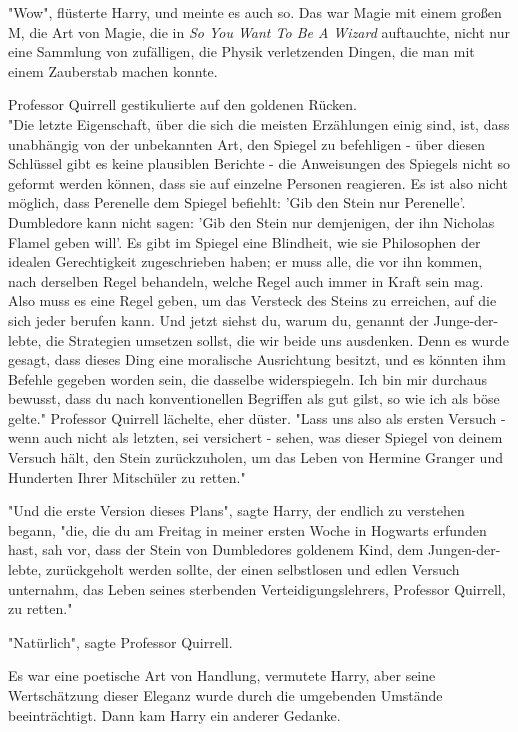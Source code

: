 {"Wow", flüsterte Harry, und meinte es auch so. Das war Magie mit einem großen M, die Art von Magie, die in \emph{So You Want To Be A Wizard} auftauchte, nicht nur eine Sammlung von zufälligen, die Physik verletzenden Dingen, die man mit einem Zauberstab machen konnte.

Professor Quirrell gestikulierte auf den goldenen Rücken.\\ "Die letzte Eigenschaft, über die sich die meisten Erzählungen einig sind, ist, dass unabhängig von der unbekannten Art, den Spiegel zu befehligen - über diesen Schlüssel gibt es keine plausiblen Berichte - die Anweisungen des Spiegels nicht so geformt werden können, dass sie auf einzelne Personen reagieren. Es ist also nicht möglich, dass Perenelle dem Spiegel befiehlt: 'Gib den Stein nur Perenelle'. Dumbledore kann nicht sagen: 'Gib den Stein nur demjenigen, der ihn Nicholas Flamel geben will'. Es gibt im Spiegel eine Blindheit, wie sie Philosophen der idealen Gerechtigkeit zugeschrieben haben; er muss alle, die vor ihn kommen, nach derselben Regel behandeln, welche Regel auch immer in Kraft sein mag. Also muss es eine Regel geben, um das Versteck des Steins zu erreichen, auf die sich jeder berufen kann. Und jetzt siehst du, warum du, genannt der Junge-der-lebte, die Strategien umsetzen sollst, die wir beide uns ausdenken. Denn es wurde gesagt, dass dieses Ding eine moralische Ausrichtung besitzt, und es könnten ihm Befehle gegeben worden sein, die dasselbe widerspiegeln. Ich bin mir durchaus bewusst, dass du nach konventionellen Begriffen als gut gilst, so wie ich als böse gelte." Professor Quirrell lächelte, eher düster. "Lass uns also als ersten Versuch - wenn auch nicht als letzten, sei versichert - sehen, was dieser Spiegel von deinem Versuch hält, den Stein zurückzuholen, um das Leben von Hermine Granger und Hunderten Ihrer Mitschüler zu retten."

"Und die erste Version dieses Plans", sagte Harry, der endlich zu verstehen begann, "die, die du am Freitag in meiner ersten Woche in Hogwarts erfunden hast, sah vor, dass der Stein von Dumbledores goldenem Kind, dem Jungen-der-lebte, zurückgeholt werden sollte, der einen selbstlosen und edlen Versuch unternahm, das Leben seines sterbenden Verteidigungslehrers, Professor Quirrell, zu retten."

"Natürlich", sagte Professor Quirrell.

Es war eine poetische Art von Handlung, vermutete Harry, aber seine Wertschätzung dieser Eleganz wurde durch die umgebenden Umstände beeinträchtigt. Dann kam Harry ein anderer Gedanke.

}
